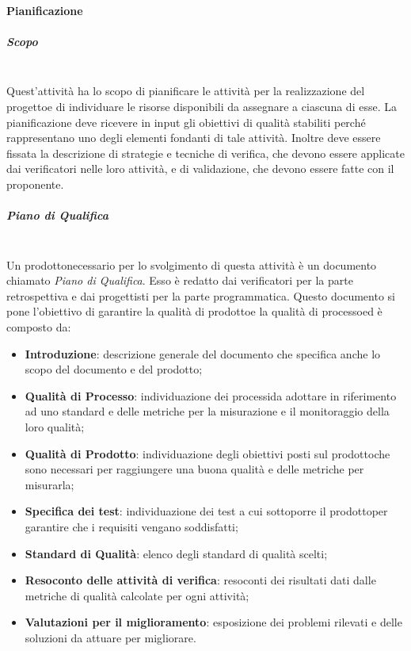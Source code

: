			\paragraph{Pianificazione}
				\subparagraph*{Scopo}\mbox{}\\ [1mm]
				Quest'attività ha lo scopo di pianificare le attività per la realizzazione del progetto\glosp e di individuare le risorse disponibili da assegnare a ciascuna di esse.
				La pianificazione deve ricevere in input gli obiettivi di qualità stabiliti perché rappresentano uno degli elementi fondanti di tale attività. Inoltre deve essere fissata la descrizione di strategie e tecniche di verifica, che devono essere applicate dai verificatori nelle loro attività, e di validazione\glo, che devono essere fatte con il proponente.
				\subparagraph*{Piano di Qualifica}\mbox{}\\ [1mm]
				Un prodotto\glosp necessario per lo svolgimento di questa attività è un documento chiamato \textit{Piano di Qualifica}. Esso è redatto dai verificatori per la parte retrospettiva e dai progettisti per la parte programmatica. Questo documento si pone l'obiettivo di garantire la qualità di prodotto\glosp e la qualità di processo\glosp ed è composto da:
				\begin{itemize}
					\item \textbf{Introduzione}: descrizione generale del documento che specifica anche lo scopo del documento e del prodotto\glo;
					\item \textbf{Qualità di Processo}\glo: individuazione dei processi\glosp da adottare in riferimento ad uno standard e delle metriche per la misurazione e il monitoraggio della loro qualità;
					\item \textbf{Qualità di Prodotto}\glo: individuazione degli obiettivi posti sul prodotto\glosp che sono necessari per raggiungere una buona qualità e delle metriche per misurarla;
					\item \textbf{Specifica dei test}: individuazione dei test a cui sottoporre il prodotto\glosp per garantire che i requisiti vengano soddisfatti;
					\item \textbf{Standard di Qualità}: elenco degli standard di qualità scelti;
					\item \textbf{Resoconto delle attività di verifica}: resoconti dei risultati dati dalle metriche di qualità calcolate per ogni attività;
					\item \textbf{Valutazioni per il miglioramento}: esposizione dei problemi rilevati e delle soluzioni da attuare per migliorare.
				\end{itemize}

